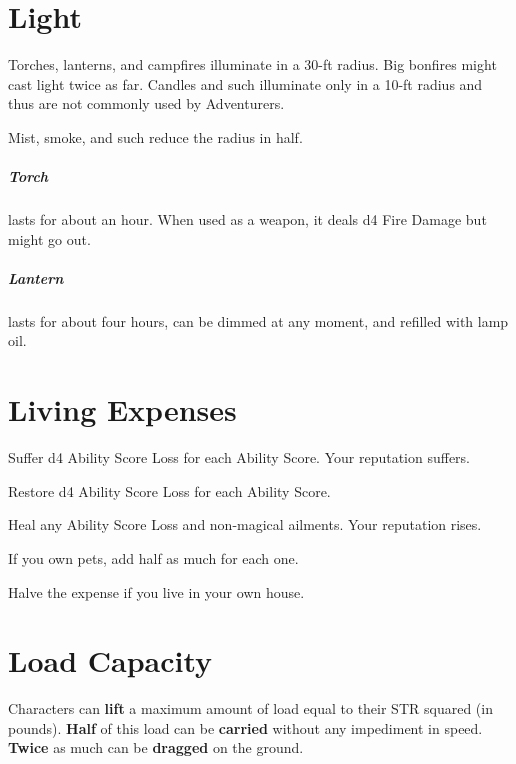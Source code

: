 \documentclass[itdr/core]{subfiles}
\begin{document}
\vfill

\section{Light}

Torches, lanterns, and campfires illuminate in a \mbox{30-ft} radius. Big bonfires might cast light twice as far. Candles and such illuminate only in a 10-ft radius and thus are not commonly used by Adventurers.

Mist, smoke, and such reduce the radius in half.

\subparagraph{Torch} lasts for about an hour. When used as a weapon, it deals d4 Fire Damage but might go out.

\subparagraph{Lantern} lasts for about four hours, can be dimmed at any moment, and refilled with lamp oil.

\vfill

\section{Living Expenses}

Suffer d4 Ability Score Loss for each Ability Score. Your reputation suffers.

Restore d4 Ability Score Loss for each Ability Score.

Heal any Ability Score Loss and non-magical ailments. Your reputation rises.

If you own pets, add half as much for each one.

Halve the expense if you live in your own house.

\vfill

\section{Load Capacity}

Characters can \textbf{lift} a maximum amount of load equal to their STR squared (in pounds). \textbf{Half} of this load can be \textbf{carried} without any impediment in speed. \textbf{Twice} as much can be \textbf{dragged} on the ground.
\end{document}
